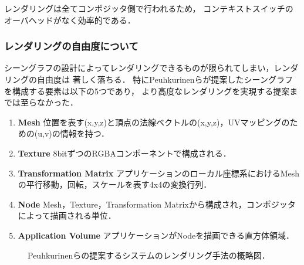 レンダリングは全てコンポジッタ側で行われるため，
コンテキストスイッチのオーバヘッドがなく効率的である．

\subsubsection*{レンダリングの自由度について}

シーングラフの設計によってレンダリングできるものが限られてしまい，レンダリングの自由度は
著しく落ちる．
特にPeuhkurinenらが提案したシーングラフを構成する要素は以下の5つであり，
より高度なレンダリングを実現する提案までは至らなかった．

\begin{enumerate}
  \item \textbf{Mesh}
        位置を表す(x,y,z)と頂点の法線ベクトルの(x,y,z)，UVマッピングのための(u,v)の情報を持つ．
  \item \textbf{Texture}
        8bitずつのRGBAコンポーネントで構成される．
  \item \textbf{Transformation Matrix}
        アプリケーションのローカル座標系におけるMeshの平行移動，回転，スケールを表す4x4の変換行列．
  \item \textbf{Node}
        Mesh，Texture，Transformation Matrixから構成され，コンポジッタによって描画される単位．
  \item \textbf{Application Volume}
        アプリケーションがNodeを描画できる直方体領域．
\end{enumerate}

\begin{figure}[htbp]
  \centering
  \caption{
    Peuhkurinenら\cite{peuhkurinen}の提案するシステムのレンダリング手法の概略図．
  }
  \label{fig:peuhkurinen-rendering}
\end{figure}



